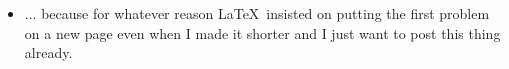 \documentclass[11pt]{hmcpset}
\begin{document}


\begin{problem}
	\begin{itemize}
		\item ... because for whatever reason \LaTeX \ insisted on putting the first problem on a new page even when I made it shorter and I just want to post this thing already.
	\end{itemize}
\end{problem}

\begin{solution}
	\vfill
\end{solution}
\pagebreak

%
%
\end{document}
